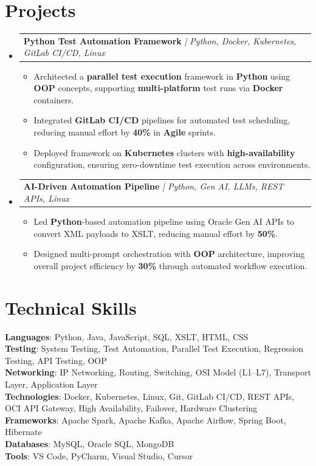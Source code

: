 \documentclass[letterpaper,11pt]{article}
\makeatletter
\newcommand{\resumeItem}[1]{
  \item\small{
    {#1 \vspace{-2pt}}
  }
}
\newcommand{\resumeProjectHeading}[2]{
    \item
    \begin{tabular*}{0.97\textwidth}{l@{\extracolsep{\fill}}r}
      \small#1 & #2 \\
    \end{tabular*}\vspace{-7pt}
}
\newcommand{\resumeSubHeadingListStart}{\begin{itemize}[leftmargin=0.15in, label={}]}
\newcommand{\resumeSubHeadingListEnd}{\end{itemize}}
\newcommand{\resumeItemListStart}{\begin{itemize}}
\newcommand{\resumeItemListEnd}{\end{itemize}\vspace{-5pt}}
\makeatother
\begin{document}
\section{Projects}
\resumeSubHeadingListStart
    \resumeProjectHeading
        {\textbf{Python Test Automation Framework} \textit{| Python, Docker, Kubernetes, GitLab CI/CD, Linux}}{}
    \resumeItemListStart
        \resumeItem{Architected a \textbf{parallel test execution} framework in \textbf{Python} using \textbf{OOP} concepts, supporting \textbf{multi-platform} test runs via \textbf{Docker} containers.}
        \resumeItem{Integrated \textbf{GitLab CI/CD} pipelines for automated test scheduling, reducing manual effort by \textbf{40\%} in \textbf{Agile} sprints.}
        \resumeItem{Deployed framework on \textbf{Kubernetes} clusters with \textbf{high-availability} configuration, ensuring zero-downtime test execution across environments.}
    \resumeItemListEnd
    \resumeProjectHeading
        {\textbf{AI-Driven Automation Pipeline} \textit{| Python, Gen AI, LLMs, REST APIs, Linux}}{}
    \resumeItemListStart
        \resumeItem{Led \textbf{Python}-based automation pipeline using Oracle Gen AI APIs to convert XML payloads to XSLT, reducing manual effort by \textbf{50\%}.}
        \resumeItem{Designed multi-prompt orchestration with \textbf{OOP} architecture, improving overall project efficiency by \textbf{30\%} through automated workflow execution.}
    \resumeItemListEnd
\resumeSubHeadingListEnd

\section{Technical Skills}
\begin{itemize}[leftmargin=0.15in, label={}]
    \small{\item{
        \textbf{Languages}{: Python, Java, JavaScript, SQL, XSLT, HTML, CSS} \\
        \textbf{Testing}{: System Testing, Test Automation, Parallel Test Execution, Regression Testing, API Testing, OOP} \\
        \textbf{Networking}{: IP Networking, Routing, Switching, OSI Model (L1--L7), Transport Layer, Application Layer} \\
        \textbf{Technologies}{: Docker, Kubernetes, Linux, Git, GitLab CI/CD, REST APIs, OCI API Gateway, High Availability, Failover, Hardware Clustering} \\
        \textbf{Frameworks}{: Apache Spark, Apache Kafka, Apache Airflow, Spring Boot, Hibernate} \\
        \textbf{Databases}{: MySQL, Oracle SQL, MongoDB} \\
        \textbf{Tools}{: VS Code, PyCharm, Visual Studio, Cursor}
    }}
\end{itemize}
\end{document}
